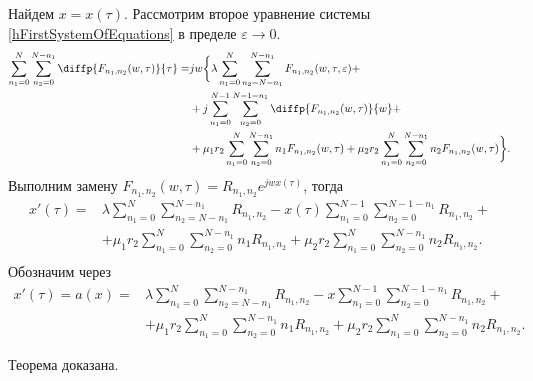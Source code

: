 Найдем $x=x(\tau)$. Рассмотрим второе уравнение системы \eqref{hFirstSystemOfEquations} в пределе $\varepsilon \rightarrow 0$.
\begin{align*}
\sum_{n_1=0}^N\sum_{n_2=0}^{N-n_1} \diffp{F_{n_{1}, n_{2}}(w,\tau)}{\tau}=
&jw\bigg\{\lambda \sum_{n_1=0}^N\sum_{n_2=N-n_1}^{N-n_1} 
F_{n_{1}, n_{2}}(w,\tau, \varepsilon)+\\
&+ j\sum_{n_1=0}^{N-1}\sum_{n_2=0}^{N-1-n_1} 
\diffp{F_{n_{1}, n_{2}}(w,\tau)}{w}+\\
&+\mu_1 r_2 \sum_{n_1=0}^{N}\sum_{n_2=0}^{N-n_1} 
n_1 F_{n_{1}, n_{2}}(w,\tau)
+\mu_2 r_2 \sum_{n_1=0}^{N}\sum_{n_2=0}^{N-n_1} 
n_2 F_{n_{1}, n_{2}}(w,\tau)\bigg\}.\\
\end{align*} 
Выполним замену $F_{n_{1}, n_{2}}(w,\tau)=R_{n_{1}, n_{2}}e^{jwx(\tau)}$, тогда
\begin{equation*}
	\begin{aligned}
		x'(\tau) =
		&\lambda \sum_{n_1=0}^N\sum_{n_2=N-n_1}^{N-n_1} 
		R_{n_{1}, n_{2}}
		- x(\tau)\sum_{n_1=0}^{N-1}\sum_{n_2=0}^{N-1-n_1} 
		R_{n_{1}, n_{2}}+\\
		&+\mu_1 r_2 \sum_{n_1=0}^{N}\sum_{n_2=0}^{N-n_1} 
		n_1 R_{n_{1}, n_{2}}
		+\mu_2 r_2 \sum_{n_1=0}^{N}\sum_{n_2=0}^{N-n_1} 
		n_2 R_{n_{1}, n_{2}}.\\
	\end{aligned}
\end{equation*}
Обозначим через
\begin{equation}\label{a_func}
	\begin{aligned}
		x'(\tau)=a(x)=&\lambda \sum_{n_1=0}^N\sum_{n_2=N-n_1}^{N-n_1} 
		R_{n_{1}, n_{2}}
		- x\sum_{n_1=0}^{N-1}\sum_{n_2=0}^{N-1-n_1} 
		R_{n_{1}, n_{2}}+\\
		&+\mu_1 r_2 \sum_{n_1=0}^{N}\sum_{n_2=0}^{N-n_1} 
		n_1 R_{n_{1}, n_{2}}
		+\mu_2 r_2 \sum_{n_1=0}^{N}\sum_{n_2=0}^{N-n_1} 
		n_2 R_{n_{1}, n_{2}}.
	\end{aligned}
\end{equation}

Теорема доказана.